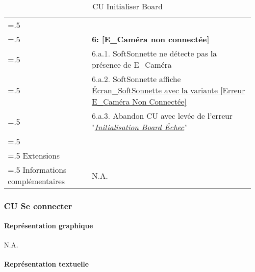 \begin{table}[H]
\begin{tabularx}{\textwidth}{|>{\hsize=.5\hsize}X|>{\hsize=1.5\hsize}X|}
    & \\
    & \textbf{6: [E\_Caméra non connectée]} \\
    & 6.a.1. SoftSonnette ne détecte pas la présence de E\_Caméra \\
    & 6.a.2. SoftSonnette affiche \hyperlink{EcranWebcamNonConnec}{Écran\_SoftSonnette avec la variante [Erreur E\_Caméra Non Connectée]} \\
    & 6.a.3. Abandon CU avec levée de l'erreur "\hyperlink{initBoardEchec}{\textit{Initialisation Board Échec}}" \\
    & \\
    \hline
    Extensions & \\
    \hline
    Informations complémentaires & N.A. \\
    \hline
  \end{tabularx}
  \caption{CU Initialiser Board}
  \label{tableau-cu-initialiser-board}
\end{table}

\newpage
\subsubsection{CU Se connecter}

\paragraph{Représentation graphique}

N.A.

\paragraph{Représentation textuelle}
\hypertarget{CU_connecte}{}

